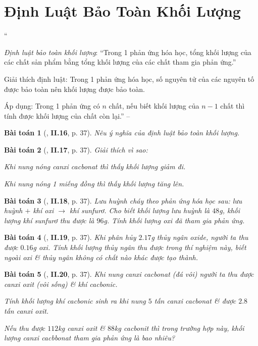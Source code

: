 \documentclass{article}
\numberwithin{equation}{section}
\newtheorem{baitoan}{Bài toán}
\begin{document}
\section{Định Luật Bảo Toàn Khối Lượng}
``\begin{enumerate*}
	\item[\textbf{1.}] \textit{Định luật bảo toàn khối lượng}: ``Trong 1 phản ứng hóa học, tổng khối lượng của các chất sản phẩm bằng tổng khối lượng của các chất tham gia phản ứng.''
	\item[\textbf{2.}] Giải thích định luật: Trong 1 phản ứng hóa học, số nguyên tử của các nguyên tố được bảo toàn nên khối lượng được bảo toàn.
	\item[\textbf{3.}] Áp dụng: Trong 1 phản ứng có $n$ chất, nếu biết khối lượng của $n - 1$ chất thì tính được khối lượng của chất còn lại.'' -- \cite[p. 37]{Truong2021}
\end{enumerate*}

\begin{baitoan}[\cite{Truong2021}, \textbf{II.16}, p. 37]
	Nêu ý nghĩa của định luật bảo toàn khối lượng.
\end{baitoan}

\begin{baitoan}[\cite{Truong2021}, \textbf{II.17}, p. 37]
	Giải thích vì sao:
	\begin{enumerate*}
		\item[(a)] Khi nung nóng canxi cacbonat \emph{} thì thấy khối lượng giảm đi.
		\item[(b)] Khi nung nóng 1 miếng đồng thì thấy khối lượng tăng lên.
	\end{enumerate*}
\end{baitoan}

\begin{baitoan}[\cite{Truong2021}, \textbf{II.18}, p. 37]
	Lưu huỳnh cháy theo phản ứng hóa học sau: lưu huỳnh $+$ khí oxi $\to$ khí sunfurơ. Cho biết khối lượng lưu huỳnh là $48$\emph{g}, khối lượng khí sunfurơ thu được là $96$\emph{g}. Tính khối lượng oxi đã tham gia phản ứng.
\end{baitoan}

\begin{baitoan}[\cite{Truong2021}, \textbf{II.19}, p. 37]
	Khi phân hủy $2.17$\emph{g} thủy ngân oxide, người ta thu được $0.16$\emph{g} oxi. Tính khối lượng thủy ngân thu được trong thí nghiệm này, biết ngoài oxi \& thủy ngân không có chất nào khác được tạo thành.
\end{baitoan}

\begin{baitoan}[\cite{Truong2021}, \textbf{II.20}, p. 37]
	Khi nung canxi cacbonat (đá vôi) người ta thu được canxi oxit (vôi sống) \& khí cacbonic.
	\begin{enumerate*}
		\item[(a)] Tính khối lượng khí cacbonic sinh ra khi nung $5$ tấn canxi cacbonat \& được $2.8$ tấn canxi oxit.
		\item[(b)] Nếu thu được $112$\emph{kg} canxi oxit \& $88$\emph{kg} cacbonit thì trong trường hợp này, khối lượng canxi cacbbonat tham gia phản ứng là bao nhiêu?
	\end{enumerate*}
\end{baitoan}
\end{document}

